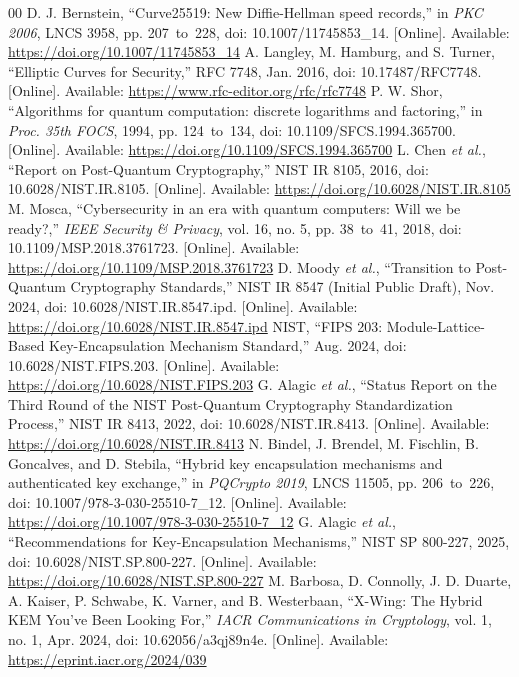 \documentclass[journal, 10pt]{IEEEtran}
\begin{document}
\begin{thebibliography}{00}
\setlength{\itemsep}{0.5pt}
\setlength{\parskip}{0pt}
 D. J. Bernstein, ``Curve25519: New Diffie-Hellman speed records,'' in \textit{PKC 2006}, LNCS 3958, pp. 207~to~228, doi: 10.1007/11745853\_14. [Online]. Available: \url{https://doi.org/10.1007/11745853_14}
 A. Langley, M. Hamburg, and S. Turner, ``Elliptic Curves for Security,'' RFC 7748, Jan. 2016, doi: 10.17487/RFC7748. [Online]. Available: \url{https://www.rfc-editor.org/rfc/rfc7748}
 P. W. Shor, ``Algorithms for quantum computation: discrete logarithms and factoring,'' in \textit{Proc. 35th FOCS}, 1994, pp. 124~to~134, doi: 10.1109/SFCS.1994.365700. [Online]. Available: \url{https://doi.org/10.1109/SFCS.1994.365700}
 L. Chen \textit{et al.}, ``Report on Post-Quantum Cryptography,'' NIST IR 8105, 2016, doi: 10.6028/NIST.IR.8105. [Online]. Available: \url{https://doi.org/10.6028/NIST.IR.8105}
 M. Mosca, ``Cybersecurity in an era with quantum computers: Will we be ready?,'' \textit{IEEE Security \& Privacy}, vol. 16, no. 5, pp. 38~to~41, 2018, doi: 10.1109/MSP.2018.3761723. [Online]. Available: \url{https://doi.org/10.1109/MSP.2018.3761723}
 D. Moody \textit{et al.}, ``Transition to Post-Quantum Cryptography Standards,'' NIST IR 8547 (Initial Public Draft), Nov. 2024, doi: 10.6028/NIST.IR.8547.ipd. [Online]. Available: \url{https://doi.org/10.6028/NIST.IR.8547.ipd}
 NIST, ``FIPS 203: Module-Lattice-Based Key-Encapsulation Mechanism Standard,'' Aug. 2024, doi: 10.6028/NIST.FIPS.203. [Online]. Available: \url{https://doi.org/10.6028/NIST.FIPS.203}
 G. Alagic \textit{et al.}, ``Status Report on the Third Round of the NIST Post-Quantum Cryptography Standardization Process,'' NIST IR 8413, 2022, doi: 10.6028/NIST.IR.8413. [Online]. Available: \url{https://doi.org/10.6028/NIST.IR.8413}
 N. Bindel, J. Brendel, M. Fischlin, B. Goncalves, and D. Stebila, ``Hybrid key encapsulation mechanisms and authenticated key exchange,'' in \textit{PQCrypto 2019}, LNCS 11505, pp. 206~to~226, doi: 10.1007/978-3-030-25510-7\_12. [Online]. Available: \url{https://doi.org/10.1007/978-3-030-25510-7_12}
 G. Alagic \textit{et al.}, ``Recommendations for Key-Encapsulation Mechanisms,'' NIST SP 800-227, 2025, doi: 10.6028/NIST.SP.800-227. [Online]. Available: \url{https://doi.org/10.6028/NIST.SP.800-227}
 M. Barbosa, D. Connolly, J. D. Duarte, A. Kaiser, P. Schwabe, K. Varner, and B. Westerbaan, ``X-Wing: The Hybrid KEM You've Been Looking For,'' \textit{IACR Communications in Cryptology}, vol. 1, no. 1, Apr. 2024, doi: 10.62056/a3qj89n4e. [Online]. Available: \url{https://eprint.iacr.org/2024/039}

\end{thebibliography}
\end{document}
